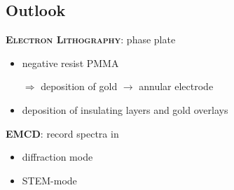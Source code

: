 \documentclass[portrait]{sciposter}
\begin{document}
\begin{multicols}{3}


\section{Outlook}
\begin{multicols}{2}
\textbf{\scshape Electron Lithography}: phase plate
\begin{itemize}
\item negative resist PMMA\cite{pmma}
\item[$\Rightarrow$] deposition of gold $\to$ annular electrode
\item deposition of insulating layers and gold overlays
\end{itemize}
\textbf{\scshape EMCD}: record spectra in
\begin{itemize}
\item diffraction mode
\item STEM-mode
\end{itemize}
\end{multicols}

\begin{multicols}{2}
\tiny


\end{multicols}

\end{multicols}
\end{document}
